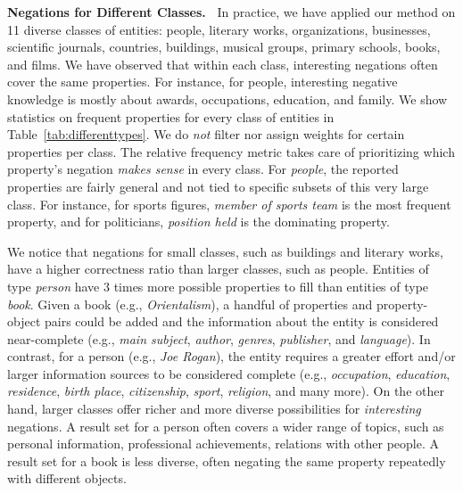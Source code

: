 \noindent
\textbf{Negations for Different Classes.\ }
In practice, we have applied our method on 11 diverse classes of entities: people, literary works, organizations, businesses, scientific journals, countries, buildings, musical groups, primary schools, books, and films. We have observed that within each class, interesting negations often cover the same properties. For instance, for people, interesting negative knowledge is mostly about awards, occupations, education, and 
family.
%
We show 
statistics on frequent properties for every class of entities in Table~\ref{tab:differenttypes}. We do \textit{not} filter nor assign weights for certain properties per class. The relative frequency metric takes care of prioritizing which property's negation \textit{makes sense} in every class. For \textit{people}, the reported properties are fairly {general} and not %
tied to
specific subsets of this very large class. For instance, for sports figures, \textit{member of sports team} is the most frequent property, and for politicians, \textit{position held} is the dominating property.

We notice that negations for small classes, such as buildings and literary works,
have a higher correctness ratio
than larger classes, such as people. Entities of type \textit{person} have 3 times more possible properties to fill than entities of type \textit{book}. Given a book (e.g., \textit{Orientalism}), a handful of properties and property-object pairs could be added and the information about the entity is considered near-complete (e.g., \textit{main subject}, \textit{author}, \textit{genres}, \textit{publisher}, and \textit{language}). 
In contrast,
for a person (e.g., \textit{Joe Rogan}), the entity requires a greater effort and/or larger information sources to be considered complete (e.g.,  \textit{occupation}, \textit{education}, \textit{residence}, \textit{birth place}, \textit{citizenship}, \textit{sport}, \textit{religion}, and many more). On the other hand, larger classes offer richer and more diverse possibilities for \textit{interesting} negations. A result set for a person often covers a wider range of topics, such as personal information, professional achievements, relations with other people. A result set for a book is less diverse, often negating the same property repeatedly with different objects.\\


